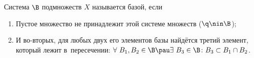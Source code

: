 
 	Система $\B$ подмножеств $X$ называется базой, если
 	\begin{enumerate}
 	  \item Пустое множество не принадлежит этой системе множеств ($\q\nin \B$);
 	  \item И во-вторых, для любых двух его элементов базы найдётся третий элемент, который лежит в~пересечении: $\forall\  B_1,B_2\in \B
 	  \pau \exists\  B_3\in\B\colon B_3\subset B_1\cap B_2$.
 	\end{enumerate}
 